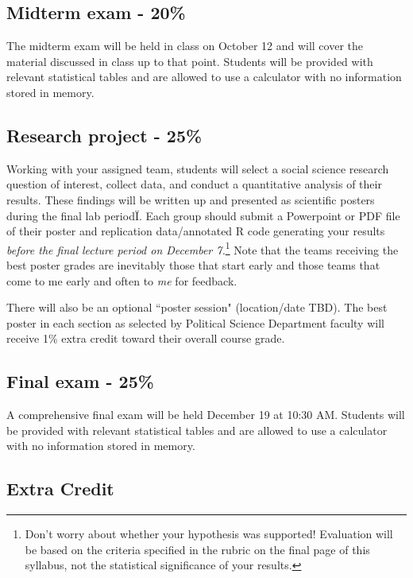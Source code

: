 \documentclass[11pt]{article}
\begin{document}
\subsection*{Midterm exam - 20\%}
The midterm exam will be held in class on October 12 and will cover
the material discussed in class up to that point. Students will be
provided with relevant statistical tables and are allowed to use a
calculator with no information stored in memory.




\subsection*{Research project - 25\%}

Working with your assigned team, students will select a social science
research question of interest, collect data, and conduct a
quantitative analysis of their results. These findings will be written
up and presented as scientific posters during the final lab
periodÏ. Each group should submit a Powerpoint or PDF file of their
poster and replication data/annotated R code generating your results
\emph{before the final lecture period on December 7.}\footnote{Don't
  worry about whether your hypothesis was supported!  Evaluation will
  be based on the criteria specified in the rubric on the final page
  of this syllabus, not the statistical significance of your results.}
Note that the teams receiving the best poster grades are inevitably
those that start early and those teams that come to me early and often
to \textit{me} for feedback.

There will also be an optional ``poster session" (location/date TBD).  The best poster
in each section as selected by Political Science Department faculty
will receive 1\% extra credit toward their overall course
grade.





\subsection*{Final exam - 25\%}
A comprehensive final exam will be held December 19 at 10:30
AM. Students will be provided with relevant statistical tables and are
allowed to use a calculator with no information stored in memory.



\subsection*{Extra Credit}
\end{document}
